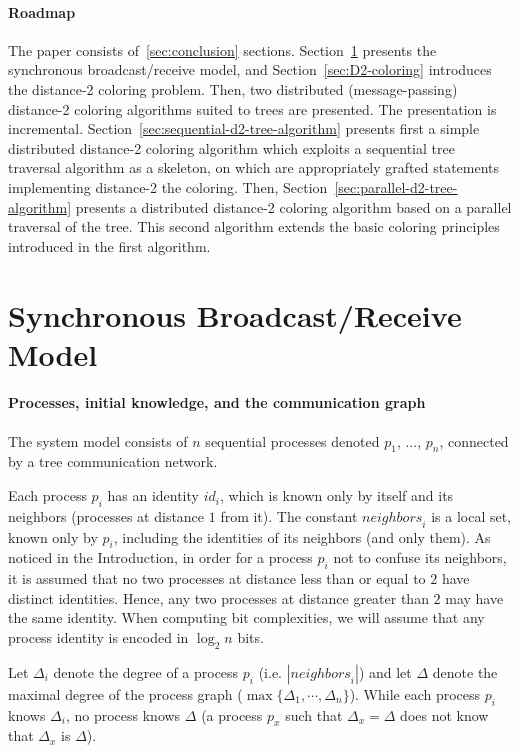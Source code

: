 \documentclass[11pt,english]{article}
\newcommand{\neighbors}{\mathit{neighbors}}
\begin{document}
\paragraph{Roadmap}
The paper consists of~\ref{sec:conclusion} sections.
Section~\ref{sec:model} presents the synchronous broadcast/receive
model, and Section~\ref{sec:D2-coloring} introduces the distance-2
coloring problem.  Then, two distributed (message-passing) distance-2
coloring algorithms suited to trees are presented.  The presentation
is incremental.  Section~\ref{sec:sequential-d2-tree-algorithm}
presents first a simple distributed distance-2 coloring algorithm
which exploits a sequential tree traversal algorithm as a skeleton, on
which are appropriately grafted statements implementing distance-2 the
coloring.  Then, Section~\ref{sec:parallel-d2-tree-algorithm} presents
a distributed distance-2 coloring algorithm based on a parallel
traversal of the tree.  This second algorithm extends the basic
coloring principles introduced in the first algorithm.



\section{Synchronous Broadcast/Receive Model}
\label{sec:model}



\paragraph{Processes, initial knowledge, and the communication graph}
The system model consists of $n$ sequential processes denoted 
$p_1$, ..., $p_n$, connected by a tree communication network. 

Each process $p_i$ has an identity $id_i$, which is known only by
itself and its neighbors (processes at distance $1$ from it).  The
constant $\neighbors_i$ is a local set, known only by $p_i$, including
the identities of its neighbors (and only them).  As noticed in the
Introduction, in order for a process $p_i$ not to confuse its
neighbors, it is assumed that no two processes at distance less
than or equal to $2$ have distinct identities.  Hence, any two
processes at distance greater than $2$ may have the same
identity. When computing bit complexities, we will assume that any
process identity is encoded in $\log_2 n$ bits.

Let $\Delta_i$ denote the degree of a process $p_i$
(i.e. $|\neighbors_i|$) and let $\Delta$ denote the maximal degree of
the process graph ($\max\{\Delta_1,\cdots,\Delta_n\}$).  While each
process $p_i$ knows $\Delta_i$, no process knows $\Delta$ (a process
$p_x$ such that $\Delta_x=\Delta$ does not know that $\Delta_x$ is
$\Delta$).
\end{document}
